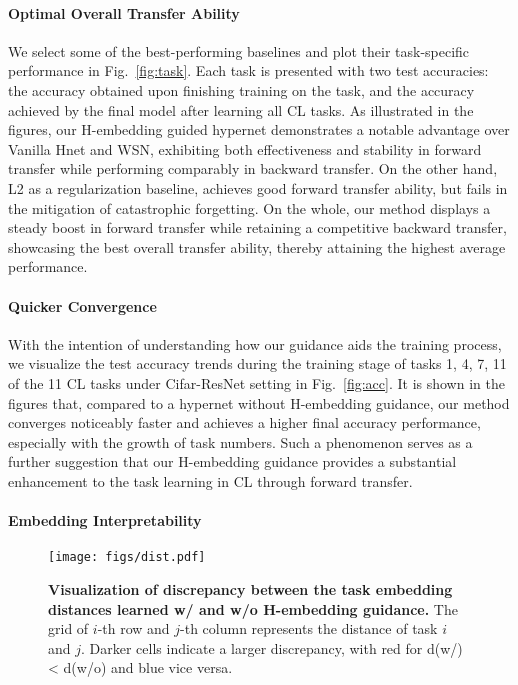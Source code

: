 \paragraph{Optimal Overall Transfer Ability} We select some of the best-performing baselines and plot their task-specific performance in Fig.~\ref{fig:task}. Each task is presented with two test accuracies: the accuracy obtained upon finishing training on the task, and the accuracy achieved by the final model after learning all CL tasks. As illustrated in the figures, our H-embedding guided hypernet demonstrates a notable advantage over Vanilla Hnet and WSN, exhibiting both effectiveness and stability in forward transfer while performing comparably in backward transfer. On the other hand, L2 as a regularization baseline, achieves good forward transfer ability, but fails in the mitigation of catastrophic forgetting. On the whole, our method displays a steady boost in forward transfer while retaining a competitive backward transfer, showcasing the best overall transfer ability, thereby attaining the highest average performance.



\paragraph{Quicker Convergence} With the intention of understanding how our guidance aids the training process, we visualize the test accuracy trends during the training stage of tasks 1, 4, 7, 11 of the 11 CL tasks under Cifar-ResNet setting in Fig.~\ref{fig:acc}. It is shown in the figures that, compared to a hypernet without H-embedding guidance, our method converges noticeably faster and achieves a higher final accuracy performance, especially with the growth of task numbers. Such a phenomenon serves as a further suggestion that our H-embedding guidance provides a substantial enhancement to the task learning in CL through forward transfer.



\paragraph{Embedding Interpretability}


\begin{figure}[!h]
    \centering
    \texttt{[image: figs/dist.pdf]}
    \caption{\textbf{Visualization of discrepancy between the task embedding distances learned w/ and w/o H-embedding guidance.} The grid of $i$-th row and $j$-th column represents the distance of task $i$ and $j$. Darker cells indicate a larger discrepancy, with red for d(w/) < d(w/o) and blue vice versa.}
\label{fig:dist}
\end{figure}


